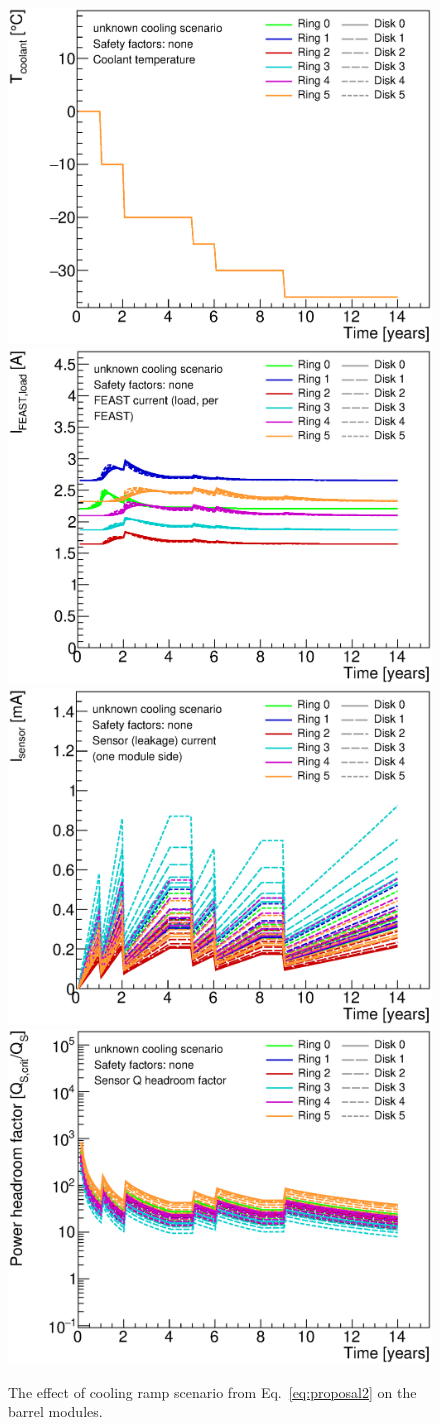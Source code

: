 \begin{figure}[ht!]
\begin{center}
\includegraphics[width=0.49\linewidth]{figures/studies/Endcap_CoolantTemperature_Proposal2.eps}
\includegraphics[width=0.49\linewidth]{figures/studies/Endcap_FeastCurrent_Proposal2.eps}
\includegraphics[width=0.49\linewidth]{figures/studies/Endcap_SensorCurrent_Proposal2.eps}
\includegraphics[width=0.49\linewidth]{figures/studies/Endcap_SensorQHeadroom_Proposal2.eps}
\end{center}
\caption{ The effect of cooling ramp scenario from Eq.~\ref{eq:proposal2} on the barrel modules.
}
\label{new_proposal2}
\end{figure}

